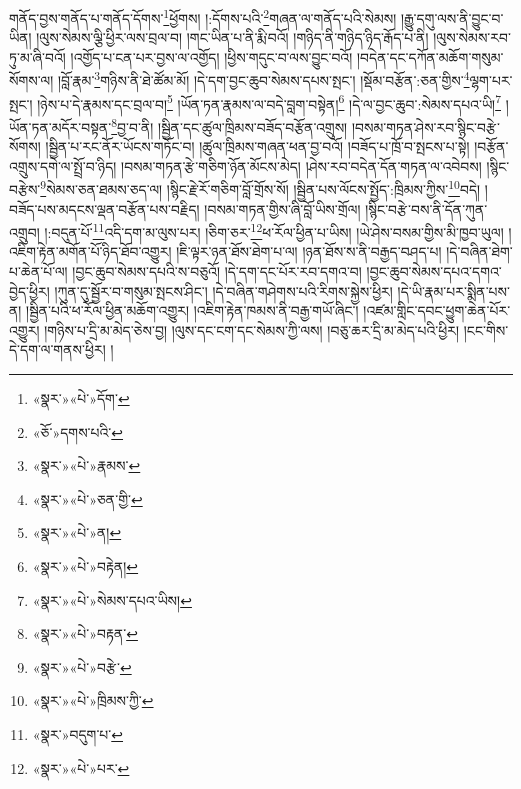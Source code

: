 གནོད་བྱས་གནོད་པ་གནོད་དོགས་\footnote{«སྣར་»«པེ་»དོག་}ཕྱོགས། །:དོགས་པའི་\footnote{«ཅོ་»དགས་པའི་}གཞན་ལ་གནོད་པའི་སེམས། །རྒྱུ་དགུ་ལས་ནི་བྱུང་བ་ཡིན། །ལུས་སེམས་ལྕི་ཕྱིར་ལས་བྲལ་བ། །གང་ཡིན་པ་ནི་རྨི་བའོ། །གཉིད་ནི་གཉིད་ཉིད་རྒོད་པ་ནི། །ལུས་སེམས་རབ་ཏུ་མ་ཞི་བའོ། །འགྱོད་པ་ངན་པར་བྱས་ལ་འགྱོད། །ཕྱིས་གདུང་བ་ལས་བྱུང་བའོ། །བདེན་དང་དཀོན་མཆོག་གསུམ་སོགས་ལ། །བློ་རྣམ་\footnote{«སྣར་»«པེ་»རྣམས་}གཉིས་ནི་ཐེ་ཚོམ་མོ། །དེ་དག་བྱང་ཆུབ་སེམས་དཔས་སྤང་། །སྡོམ་བརྩོན་:ཅན་གྱིས་\footnote{«སྣར་»«པེ་»ཅན་གྱི་}ལྷག་པར་སྤང་། །ཉེས་པ་དེ་རྣམས་དང་བྲལ་བ།\footnote{«སྣར་»«པེ་»ན།} །ཡོན་ཏན་རྣམས་ལ་བདེ་བླག་བསྟེན།\footnote{«སྣར་»«པེ་»བརྟེན།} །དེ་ལ་བྱང་ཆུབ་:སེམས་དཔའ་ཡི།\footnote{«སྣར་»«པེ་»སེམས་དཔའ་ཡིས།} །ཡོན་ཏན་མདོར་བསྟན་\footnote{«སྣར་»«པེ་»བརྟན་}བྱ་བ་ནི། །སྦྱིན་དང་ཚུལ་ཁྲིམས་བཟོད་བརྩོན་འགྲུས། །བསམ་གཏན་ཤེས་རབ་སྙིང་བརྩེ་སོགས། །སྦྱིན་པ་རང་ནོར་ཡོངས་གཏོང་བ། །ཚུལ་ཁྲིམས་གཞན་ཕན་བྱ་བའོ། །བཟོད་པ་ཁྲོ་བ་སྤངས་པ་སྟེ། །བརྩོན་འགྲུས་དགེ་ལ་སྤྲོ་བ་ཉིད། །བསམ་གཏན་རྩེ་གཅིག་ཉོན་མོངས་མེད། །ཤེས་རབ་བདེན་དོན་གཏན་ལ་འབེབས། །སྙིང་བརྩེས་\footnote{«སྣར་»«པེ་»བརྩེ་}སེམས་ཅན་ཐམས་ཅད་ལ། །སྙིང་རྗེ་རོ་གཅིག་བློ་གྲོས་སོ། །སྦྱིན་པས་ལོངས་སྤྱོད་:ཁྲིམས་ཀྱིས་\footnote{«སྣར་»«པེ་»ཁྲིམས་ཀྱི་}བདེ། །བཟོད་པས་མདངས་ལྡན་བརྩོན་པས་བརྗིད། །བསམ་གཏན་གྱིས་ཞི་བློ་ཡིས་གྲོལ། །སྙིང་བརྩེ་བས་ནི་དོན་ཀུན་འགྲུབ། །:བདུན་པོ་\footnote{«སྣར་»བདུག་པ་}འདི་དག་མ་ལུས་པར། །ཅིག་ཅར་\footnote{«སྣར་»«པེ་»པར་}ཕ་རོལ་ཕྱིན་པ་ཡིས། །ཡེ་ཤེས་བསམ་གྱིས་མི་ཁྱབ་ཡུལ། །འཇིག་རྟེན་མགོན་པོ་ཉིད་ཐོབ་འགྱུར། །ཇི་ལྟར་ཉན་ཐོས་ཐེག་པ་ལ། །ཉན་ཐོས་ས་ནི་བརྒྱད་བཤད་པ། །དེ་བཞིན་ཐེག་པ་ཆེན་པོ་ལ། །བྱང་ཆུབ་སེམས་དཔའི་ས་བཅུའོ། །དེ་དག་དང་པོར་རབ་དགའ་བ། །བྱང་ཆུབ་སེམས་དཔའ་དགའ་བྱེད་ཕྱིར། །ཀུན་དུ་སྦྱོར་བ་གསུམ་སྤངས་ཤིང་། །དེ་བཞིན་གཤེགས་པའི་རིགས་སྐྱེས་ཕྱིར། །དེ་ཡི་རྣམ་པར་སྨིན་པས་ན། །སྦྱིན་པའི་ཕ་རོལ་ཕྱིན་མཆོག་འགྱུར། །འཇིག་རྟེན་ཁམས་ནི་བརྒྱ་གཡོ་ཞིང་། །འཛམ་གླིང་དབང་ཕྱུག་ཆེན་པོར་འགྱུར། །གཉིས་པ་དྲི་མ་མེད་ཅེས་བྱ། །ལུས་དང་ངག་དང་སེམས་ཀྱི་ལས། །བཅུ་ཆར་དྲི་མ་མེད་པའི་ཕྱིར། །ངང་གིས་དེ་དག་ལ་གནས་ཕྱིར། །
